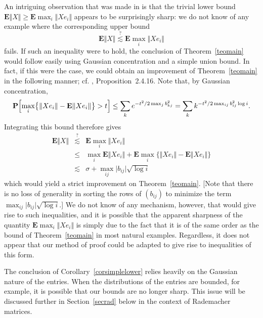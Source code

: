 \documentclass[aop,MSNbibl,dvips]{arximspdf}
\newcommand{\rrvert}{\vert}
\newcommand{\rrVert}{\Vert}
\newcommand{\llvert}{\vert}
\newcommand{\llVert}{\Vert}
\newcommand{\EE}{\mathbf{E}}
\begin{document}
%
\begin{rem}
\label{remschutt}
An intriguing observation that was made in \cite{RS13} is that the trivial
lower bound $\EE\llVert X\rrVert \ge\EE\max_i\llVert Xe_i\rrVert $
appears to be surprisingly
sharp: we do not know of any example where the corresponding upper bound
%
\[
\EE\llVert X\rrVert\stackrel{?} {\lesssim}\EE\max
_i\llVert Xe_i\rrVert%
\]
%
fails. If such an inequality were to hold, the conclusion of
Theorem~\ref{teomain} would follow easily using Gaussian
concentration and a
simple union bound.
In fact, if this were the case, we could obtain an improvement of
Theorem~\ref{teomain} in the following manner; cf. \cite{Tal14},
Proposition~2.4.16. Note that, by Gaussian concentration,
%
\[
\mathbf{P} \Bigl[\max_{i}\bigl\{\llVert Xe_i
\rrVert-\EE\llVert Xe_i\rrVert\bigr\}>t \Bigr] \le\sum
_{k} e^{-t^2/2\max_jb_{kj}^2} = \sum_{k}
k^{-t^2/2 \max_{ij}b_{ij}^2\log i}. %
\]
%
Integrating this bound therefore gives
%
\begin{eqnarray*}
\EE\llVert X\rrVert  &\stackrel{?} {\lesssim}& \EE\max
_i\llVert Xe_i\rrVert
\\
&\le&\max_i\EE\llVert Xe_i\rrVert+ \EE\max
_i\bigl\{\llVert Xe_i\rrVert-\EE\llVert
Xe_i\rrVert\bigr\}
\\
&\lesssim&\sigma+ \max_{ij}\llvert b_{ij}\rrvert
\sqrt{\log i}
\end{eqnarray*}
%
which would yield a strict improvement on Theorem~\ref{teomain}. [Note
that there is no loss of generality in sorting the rows of $(b_{ij})$ to
minimize the term $\max_{ij}\llvert b_{ij}\rrvert \sqrt{\log i}$.] We
do not know
of any mechanism, however, that would give rise to such inequalities, and
it is possible that the apparent sharpness of the quantity
$\EE\max_i\llVert Xe_i\rrVert $ is simply due to the fact that it is
of the same
order as the bound of Theorem~\ref{teomain} in most natural examples.
Regardless, it does not appear that our method of proof could be adapted
to give rise to inequalities of this form.
\end{rem}

%
\begin{rem}
The conclusion of Corollary~\ref{corsimplelower} relies heavily
on the Gaussian nature of the entries. When the distributions of
the entries are bounded, for example, it is possible that our bounds are
no longer sharp. This issue will be discussed further in
Section~\ref{secrad} below in the context of Rademacher matrices.
\end{rem}
\end{document}
